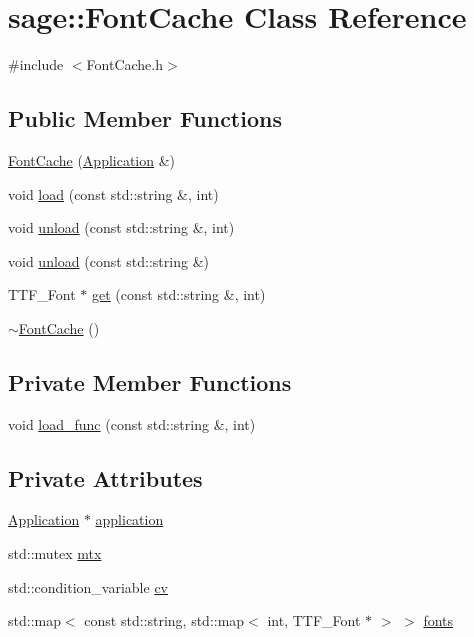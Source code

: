 \hypertarget{classsage_1_1FontCache}{}\section{sage\+::Font\+Cache Class Reference}
\label{classsage_1_1FontCache}


{\ttfamily \#include $<$Font\+Cache.\+h$>$}

\subsection*{Public Member Functions}
\begin{DoxyCompactItemize}
\item 
\mbox{\hyperlink{classsage_1_1FontCache_af000fb145e7692fb178bc8bb334fbf16}{Font\+Cache}} (\mbox{\hyperlink{classsage_1_1Application}{Application}} \&)
\item 
void \mbox{\hyperlink{classsage_1_1FontCache_a2221e34a4ddd51266f374b727baac79e}{load}} (const std\+::string \&, int)
\item 
void \mbox{\hyperlink{classsage_1_1FontCache_a0d4b71fedf081cb72eab09dc53ea251f}{unload}} (const std\+::string \&, int)
\item 
void \mbox{\hyperlink{classsage_1_1FontCache_a7c166cbed37cfeee2ea02e698e6c58d0}{unload}} (const std\+::string \&)
\item 
T\+T\+F\+\_\+\+Font $\ast$ \mbox{\hyperlink{classsage_1_1FontCache_a36e3d099603a50bc73a4d8ff6d6bc8dc}{get}} (const std\+::string \&, int)
\item 
\mbox{\hyperlink{classsage_1_1FontCache_a91c4f1c179ae27d846a9f0180ea2e0dc}{$\sim$\+Font\+Cache}} ()
\end{DoxyCompactItemize}
\subsection*{Private Member Functions}
\begin{DoxyCompactItemize}
\item 
void \mbox{\hyperlink{classsage_1_1FontCache_a9792b2e9a7db90b2c44a9ebfd8fe9067}{load\+\_\+func}} (const std\+::string \&, int)
\end{DoxyCompactItemize}
\subsection*{Private Attributes}
\begin{DoxyCompactItemize}
\item 
\mbox{\hyperlink{classsage_1_1Application}{Application}} $\ast$ \mbox{\hyperlink{classsage_1_1FontCache_a9c600ddba2ac2370ea5ed2916ac1727a}{application}}
\item 
std\+::mutex \mbox{\hyperlink{classsage_1_1FontCache_aa60c136f3ccb1516e80321ceea56cf53}{mtx}}
\item 
std\+::condition\+\_\+variable \mbox{\hyperlink{classsage_1_1FontCache_abe84a5350b1056e3ca812e5ac9d4928b}{cv}}
\item 
std\+::map$<$ const std\+::string, std\+::map$<$ int, T\+T\+F\+\_\+\+Font $\ast$ $>$ $>$ \mbox{\hyperlink{classsage_1_1FontCache_ad5f7cceb38a5946e67fe0ec39d79c85f}{fonts}}
\end{DoxyCompactItemize}



